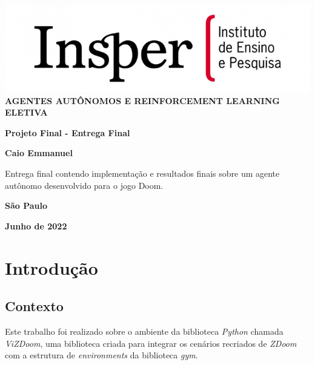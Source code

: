 \documentclass[12pt]{article}
\begin{document}
\begin{titlepage}
    \vfill
	\begin{center}
    \includegraphics[scale=1.0]{src/img/insper-cover.png}\\
	\textbf{AGENTES AUTÔNOMOS E REINFORCEMENT LEARNING \\ [0.05cm]ELETIVA}

	\vspace{0.6cm}
	\vspace{4cm}
	{\huge \textbf{Projeto Final - Entrega Final}}\vspace{8mm}
	
	{\large \textbf{Caio Emmanuel}}\\[2.5cm]
	
		\hspace{.45\textwidth} %
	   \begin{minipage}{.5\textwidth}
	   Entrega final contendo implementação e resultados finais sobre um agente autônomo desenvolvido para o jogo Doom.\\[0.1cm]
	  \end{minipage}
	  \vfill
	
	\textbf{São Paulo}
	
	\textbf{Junho de 2022}
	\end{center}
	
\end{titlepage}
\pagebreak
\tableofcontents
\pagebreak

\section{Introdução}

\subsection{Contexto}

Este trabalho foi realizado sobre o ambiente da biblioteca \textit{Python} chamada \textit{ViZDoom}\cite{vizdoom}, uma biblioteca criada para integrar os cenários recriados de \textit{ZDoom}\cite{zdoom} com a estrutura de \textit{environments} da biblioteca \textit{gym}\cite{gym}.
\end{document}
